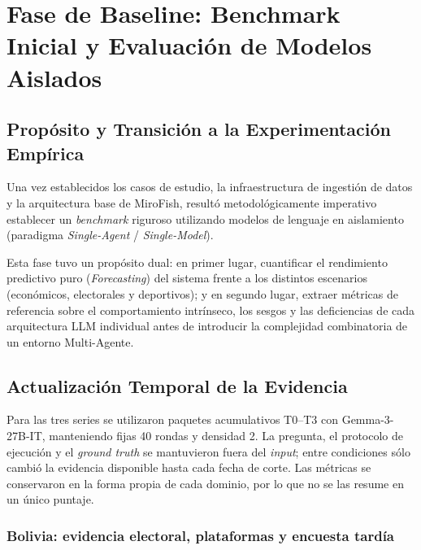 \documentclass{article}
\begin{document}
\section{Fase de Baseline: Benchmark Inicial y Evaluación de Modelos Aislados}

\subsection{Propósito y Transición a la Experimentación Empírica}

Una vez establecidos los casos de estudio, la infraestructura de ingestión de datos y la arquitectura base de MiroFish, resultó metodológicamente imperativo establecer un \textit{benchmark} riguroso utilizando modelos de lenguaje en aislamiento (paradigma \textit{Single-Agent} / \textit{Single-Model}). 

Esta fase tuvo un propósito dual: en primer lugar, cuantificar el rendimiento predictivo puro (\textit{Forecasting}) del sistema frente a los distintos escenarios (económicos, electorales y deportivos); y en segundo lugar, extraer métricas de referencia sobre el comportamiento intrínseco, los sesgos y las deficiencias de cada arquitectura LLM individual antes de introducir la complejidad combinatoria de un entorno Multi-Agente.

\subsection{Actualización Temporal de la Evidencia}

Para las tres series se utilizaron paquetes acumulativos T0--T3 con Gemma-3-27B-IT, manteniendo fijas 40 rondas y densidad 2. La pregunta, el protocolo de ejecución y el \textit{ground truth} se mantuvieron fuera del \textit{input}; entre condiciones sólo cambió la evidencia disponible hasta cada fecha de corte. Las métricas se conservaron en la forma propia de cada dominio, por lo que no se las resume en un único puntaje.

\subsubsection{Bolivia: evidencia electoral, plataformas y encuesta tardía}
\end{document}
